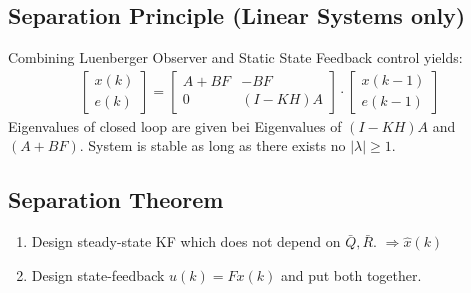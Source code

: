 \documentclass[landscape,a4paper,8pt]{scrartcl}
\begin{document}
\begin{multicols*}{3}
\subsection{Separation Principle (Linear Systems only)}
Combining Luenberger Observer and Static State Feedback control yields:
\begin{align*}
\begin{bmatrix}
x(k) \\ e(k) 
\end{bmatrix}
= 
\begin{bmatrix}
A + BF & - B F \\ 0 & (I-KH) A
\end{bmatrix}
\cdot
\begin{bmatrix}
x(k-1) \\ e(k-1)
\end{bmatrix}
\end{align*}
Eigenvalues of closed loop are given bei Eigenvalues of $(I-KH) A$ and $(A + BF)$. System is stable as long as there exists no $|\lambda| \geq 1$. \\



\subsection{Separation Theorem}

\begin{enumerate}
\item Design steady-state KF which does not depend on $\bar{Q}, \bar{R}$. $\Rightarrow \hat{x}(k)$
\item Design state-feedback $u(k) = F x(k)$ and put both together.
\end{enumerate}

\end{multicols*}
\end{document}
